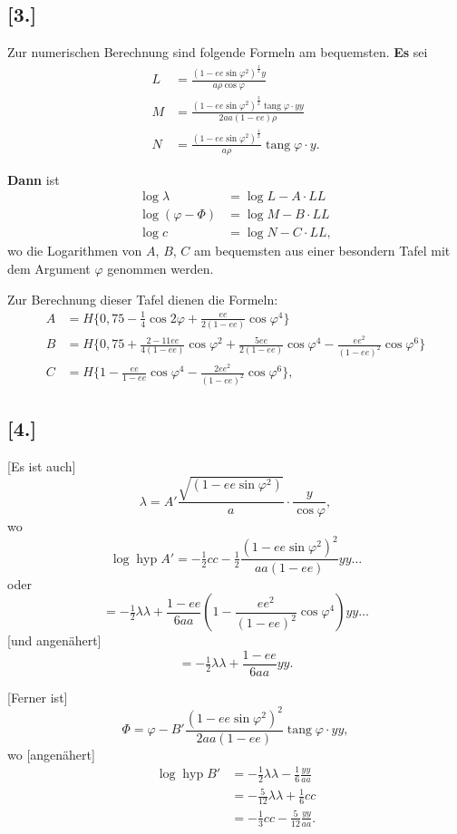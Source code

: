 \documentclass[12pt,a4paper]{article}
\theoremstyle{plain}
\theoremstyle{definition}
\theoremstyle{remark}
\newcommand{\tang}{\operatorname{tang}}
\newcommand{\ee}{\mathit{ee}}
\begin{document}
\subsection*{[3.]}
Zur numerischen Berechnung sind folgende Formeln am bequemsten.
\textbf{Es} sei
\[
\begin{aligned}
L &= \frac{(1 - \ee\sin\varphi^2)^{\frac{1}{2}}y}{a\rho\cos\varphi} \\
M &= \frac{(1 - \ee\sin\varphi^2)^{\frac{3}{2}}\tang\varphi\cdot yy}{2aa(1 - \ee)\rho} \\
N &= \frac{(1 - \ee\sin\varphi^2)^{\frac{1}{2}}}{a\rho}\tang\varphi\cdot y.
\end{aligned}
\]

\textbf{Dann} ist
\[
\begin{aligned}
\log\lambda &= \log L - A \cdot LL \\
\log(\varphi - \Phi) &= \log M - B \cdot LL \\
\log c &= \log N - C \cdot LL,
\end{aligned}
\]
wo die Logarithmen von $A$, $B$, $C$ am bequemsten aus einer besondern Tafel
mit dem Argument $\varphi$ genommen werden.

Zur Berechnung dieser Tafel dienen die Formeln:
\[
\begin{aligned}
A &= H\{0{,}75 - \tfrac{1}{4}\cos 2\varphi + \frac{\ee}{2(1 - \ee)}\cos\varphi^4\} \\
B &= H\{0{,}75 + \frac{2 - 11\ee}{4(1 - \ee)}\cos\varphi^2 + \frac{5\ee}{2(1 - \ee)}\cos\varphi^4 - \frac{\ee^2}{(1 - \ee)^2}\cos\varphi^6\} \\
C &= H\{1 - \frac{\ee}{1 - \ee}\cos\varphi^4 - \frac{2\ee^2}{(1 - \ee)^2}\cos\varphi^6\},
\end{aligned}
\]

\newpage
\subsection*{[4.]}
[Es ist auch]
\[
\lambda = A'\frac{\sqrt{(1 - \ee\sin\varphi^2)}}{a}\cdot\frac{y}{\cos\varphi},
\]
wo
\[
\log\operatorname{hyp} A' = -\tfrac{1}{2}cc - \tfrac{1}{2}\frac{(1 - \ee\sin\varphi^2)^2}{aa(1 - \ee)}yy \ldots
\]
oder
\[
= -\tfrac{1}{2}\lambda\lambda + \frac{1 - \ee}{6aa}\left(1 - \frac{\ee^2}{(1 - \ee)^2}\cos\varphi^4\right)yy \ldots
\]
[und angenähert]
\[
= -\tfrac{1}{2}\lambda\lambda + \frac{1 - \ee}{6aa}yy.
\]

[Ferner ist]
\[
\Phi = \varphi - B'\frac{(1 - \ee\sin\varphi^2)^2}{2aa(1 - \ee)}\tang\varphi\cdot yy,
\]
wo [angenähert]
\[
\begin{aligned}
\log\operatorname{hyp} B' &= -\tfrac{1}{2}\lambda\lambda - \tfrac{1}{6}\frac{yy}{aa} \\
&= -\tfrac{5}{12}\lambda\lambda + \tfrac{1}{6}cc \\
&= -\tfrac{1}{3}cc - \tfrac{5}{12}\frac{yy}{aa}.
\end{aligned}
\]
\end{document}
